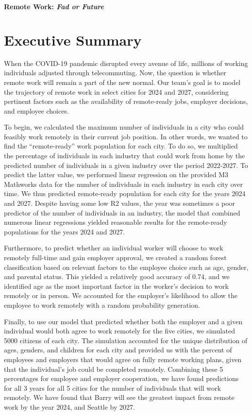 \documentclass{article}
\begin{document}
\begin{center}
\textbf{\huge Remote Work: \textit{Fad or Future}}
\end{center}

\setcounter{section}{-1}

\section{Executive Summary}
\indent
When the COVID-19 pandemic disrupted every avenue of life, millions of working individuals adjusted through telecommuting. Now, the question is whether remote work will remain a part of the new normal. Our team’s goal is to model the trajectory of remote work in select cities for 2024 and 2027, considering pertinent factors such as the availability of remote-ready jobs, employer decisions, and employee choices.

\indent
To begin, we calculated the maximum number of individuals in a city who could feasibly work remotely in their current job position. In other words, we wanted to find the “remote-ready” work population for each city. To do so, we multiplied the percentage of individuals in each industry that could work from home by the predicted number of individuals in a given industry over the period 2022-2027. To predict the latter value, we performed linear regression on the provided M3 Mathworks data for the number of individuals in each industry in each city over time. We thus predicted remote-ready population for each city for the years 2024 and 2027. Despite having some low R2 values, the year was sometimes a poor predictor of the number of individuals  in an industry, the model that combined numerous linear regressions yielded reasonable results for the remote-ready populations for the years 2024 and 2027.

\indent
Furthermore, to predict whether an individual worker will choose to work remotely full-time and gain employer approval, we created a random forest classification based on relevant factors to the employee choice such as age, gender, and parental status. This yielded a relatively good accuracy of 0.74, and we identified age as the most important factor in the worker’s decision to work remotely or in person. We  accounted for the employer’s likelihood to allow the employee to work remotely with a random probability generation.

\indent
	Finally, to use our model that predicted whether both the employer and a given individual would both agree to work remotely for the five cities, we simulated 5000 citizens of each city. The simulation accounted for the unique distribution of ages, genders, and children for each city and provided us with the percent of employees and employers that would agree on fully remote working plans, given that the individual’s job could be completed remotely. Combining these 5 percentages for employee and employer cooperation, we have found predictions for all 3 years for all 5 cities for the number of individuals that will work remotely. We have found that Barry will see the greatest impact from remote work by the year 2024, and Seattle by 2027.
\end{document}
